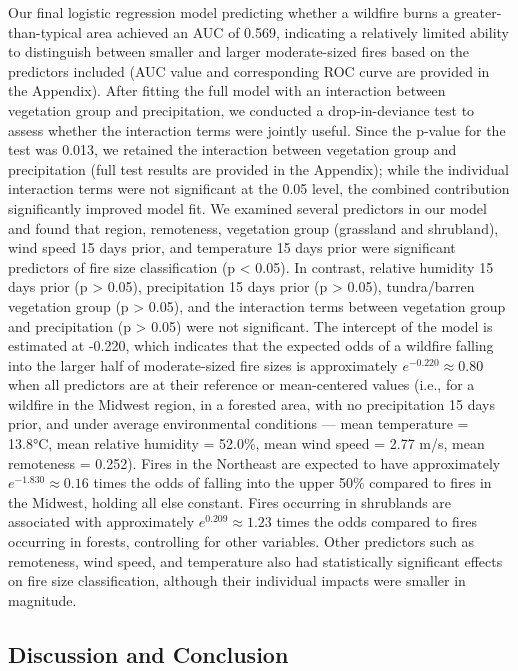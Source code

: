\documentclass[
  letterpaper,
  DIV=11,
  numbers=noendperiod]{scrartcl}
\begin{document}
Our final logistic regression model predicting whether a wildfire burns
a greater-than-typical area achieved an AUC of 0.569, indicating a
relatively limited ability to distinguish between smaller and larger
moderate-sized fires based on the predictors included (AUC value and
corresponding ROC curve are provided in the Appendix). After fitting the
full model with an interaction between vegetation group and
precipitation, we conducted a drop-in-deviance test to assess whether
the interaction terms were jointly useful. Since the p-value for the
test was 0.013, we retained the interaction between vegetation group and
precipitation (full test results are provided in the Appendix); while
the individual interaction terms were not significant at the 0.05 level,
the combined contribution significantly improved model fit. We examined
several predictors in our model and found that region, remoteness,
vegetation group (grassland and shrubland), wind speed 15 days prior,
and temperature 15 days prior were significant predictors of fire size
classification (p \textless{} 0.05). In contrast, relative humidity 15
days prior (p \textgreater{} 0.05), precipitation 15 days prior (p
\textgreater{} 0.05), tundra/barren vegetation group (p \textgreater{}
0.05), and the interaction terms between vegetation group and
precipitation (p \textgreater{} 0.05) were not significant. The
intercept of the model is estimated at -0.220, which indicates that the
expected odds of a wildfire falling into the larger half of
moderate-sized fire sizes is approximately \(e^{-0.220} \approx 0.80\)
when all predictors are at their reference or mean-centered values
(i.e., for a wildfire in the Midwest region, in a forested area, with no
precipitation 15 days prior, and under average environmental conditions
--- mean temperature = 13.8°C, mean relative humidity = 52.0\%, mean
wind speed = 2.77 m/s, mean remoteness = 0.252). Fires in the Northeast
are expected to have approximately \(e^{-1.830} \approx 0.16\) times the
odds of falling into the upper 50\% compared to fires in the Midwest,
holding all else constant. Fires occurring in shrublands are associated
with approximately \(e^{0.209} \approx 1.23\) times the odds compared to
fires occurring in forests, controlling for other variables. Other
predictors such as remoteness, wind speed, and temperature also had
statistically significant effects on fire size classification, although
their individual impacts were smaller in magnitude.

\subsection{Discussion and Conclusion}\label{discussion-and-conclusion}
\end{document}
